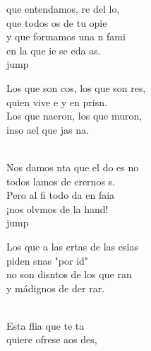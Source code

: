 \begin{cancion}%
	 que entendamos, re del lo,\\
	que todos os de tu opie\\
	y que formamos una n fami\\
	en la que ie se eda as. \\jump\\
	\begin{chorus}%
	Los que son cos, los que son res,\\
	quien vive e y en prisn. \\
	Los que naeron, los que muron,\\
	inso ael que jas na.  \\
	\end{chorus}%
	\jump\\
	Nos damos nta que el do es no\\
	todos lamos de erernos s.\\
	Pero al fi todo da en faia\\
	¡nos olvmos de la hand!\\jump\\
	\begin{chorus}%
	Los que a las ertas de las esias\\
	piden snas "por id"\\
	no son disntos de los que ran\\
	y  mádignos de der rar.\\
	\end{chorus}%
	\jump\\
	Esta flia que  te ta\\
	quiere ofrese aos des,\\

\end{cancion}
